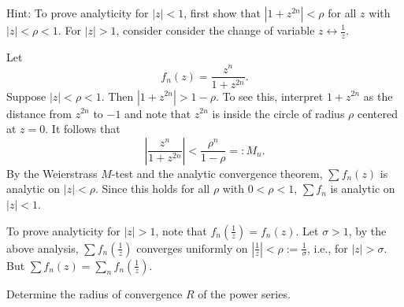 \documentclass[12pt, answers]{exam}
\begin{document}
\begin{questions}
    Hint: To prove analyticity for $|z|<1$, first show that $|1+z^{2n}|<\rho$
    for all $z$ with $|z|<\rho < 1$.
    For $|z|>1$, consider consider the change of variable $z\leftrightarrow \frac1z$.

    \begin{solution}
        Let
        $$
        f_n(z) = \frac{z^n}{1+z^{2n}}.
        $$
        Suppose $|z|<\rho < 1$. Then $|1+z^{2n}|> 1 - \rho$.
        To see this, interpret $1+z^{2n}$ as the distance from $z^{2n}$ to $-1$
        and note that $z^{2n}$ is inside the circle of radius $\rho$ centered at $z=0$.
        It follows that
        $$\left|\frac{z^n}{1+z^{2n}}\right| < \frac{\rho^n}{1 - \rho} =: M_n.$$
        By the Weierstrass $M$-test and the analytic convergence theorem,
        $\sum f_n(z)$ is analytic on $|z|<\rho$.
        Since this holds for all $\rho$ with $0<\rho < 1$,
        $\sum f_n$ is analytic on $|z|<1$.

        To prove analyticity for $|z|>1$, note that $f_n(\frac1z)=f_n(z)$.
        Let $\sigma >1$, by the above analysis, $\sum f_n(\frac1z)$
        converges uniformly on $|\frac1z| <\rho := \frac1\sigma$, i.e., for $|z|>\sigma$.
        But $\sum f_n(z) = \sum_nf_n(\frac1z)$.
    \end{solution}

    \question
    Determine the radius of convergence $R$ of the power series.

\end{questions}
\end{document}
